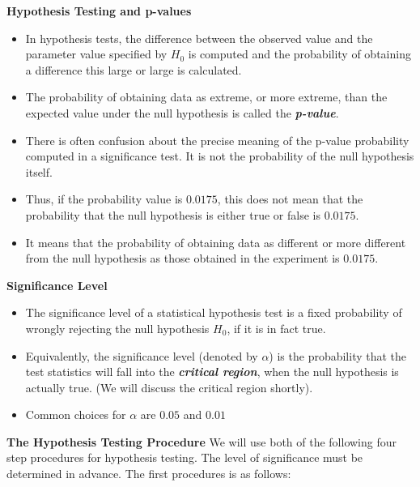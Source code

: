 \noindent \textbf{Hypothesis Testing and p-values}
\begin{itemize}
\item In hypothesis tests, the difference between the observed value and the parameter value specified by $H_0$ is computed and the probability of obtaining a difference this large or large is calculated.
\item The probability of obtaining data as extreme, or more extreme, than the expected value under the null hypothesis is called the \textbf{\emph{p-value}}.
\item There is often confusion about the precise meaning of the p-value probability computed in a significance test. It is not the probability of the null hypothesis itself.
\item Thus, if the probability value is $0.0175$, this does not mean that the probability that the null hypothesis is either true or false is $0.0175$.
\item It means that the probability of obtaining data as different or more different from the null hypothesis as those obtained in the experiment is $0.0175$.
\end{itemize}



{
\noindent \textbf{Significance Level}

\begin{itemize}
\item The significance level of a statistical hypothesis test is a fixed probability of wrongly rejecting the null hypothesis $H_0$, if it is in fact true.

\item Equivalently, the significance level (denoted by $\alpha$) is the probability that the test statistics will fall into the \textbf{\emph{critical region}}, when the null hypothesis is actually true. (We will discuss the critical region shortly).

\item Common choices for $\alpha$ are $0.05$ and $0.01$
\end{itemize}
}



\noindent \textbf{The Hypothesis Testing Procedure }
We will use both of the following four step procedures for hypothesis testing. The level of significance must be determined in advance. The first procedures is as follows:

